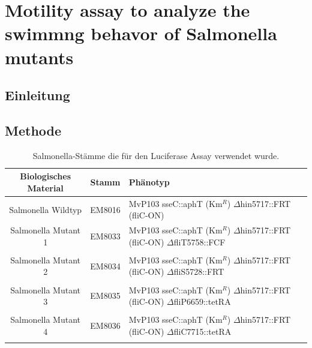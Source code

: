 \documentclass[oneside,10pt,a4paper]{report}
\begin{document}
		\section{Motility assay to analyze the swimmng behavor of Salmonella mutants}
		
			\subsection{Einleitung}
			
			\subsection{Methode}
				\begin{table}[H]
				\centering
				\caption{Salmonella-Stämme die für den Luciferase Assay verwendet wurde.}
				\label{tab: exp6-biologisches Material part3}
				\begin{tabular}{ccp{5cm}}
					\toprule
					Biologisches Material& Stamm & Phänotyp\\
					\midrule
					\multirow{3}{*}{\parbox[t]{2cm}{Salmonella Wildtyp }}  & \multirow{3}{*}{EM8016} & \multirow{3}{*}{\parbox[t]{4.5cm}{MvP103 sseC::aphT (Km$^R$) $\Delta$hin5717::FRT (fliC-ON)}}\\
					&&\\
					&&\\
					\multirow{3}{*}{\parbox[t]{2cm}{Salmonella Mutant 1}}  & \multirow{3}{*}{EM8033} & \multirow{3}{*}{\parbox[t]{4.5cm}{MvP103 sseC::aphT (Km$^R$) $\Delta$hin5717::FRT (fliC-ON) $\Delta$fliT5758::FCF}}\\
					&&\\
					&&\\
					&&\\
					\multirow{3}{*}{\parbox[t]{2cm}{Salmonella Mutant 2}}  & \multirow{3}{*}{EM8034} & \multirow{3}{*}{\parbox[t]{4.5cm}{MvP103 sseC::aphT (Km$^R$) $\Delta$hin5717::FRT (fliC-ON) $\Delta$fliS5728::FRT}}\\
					&&\\
					&&\\
					&&\\
					\multirow{3}{*}{\parbox[t]{2cm}{Salmonella Mutant 3}} & \multirow{3}{*}{EM8035} &\multirow{3}{*}{\parbox[t]{4.5cm}{MvP103 sseC::aphT (Km$^R$) $\Delta$hin5717::FRT (fliC-ON) $\Delta$fliP6659::tetRA}} \\
					&&\\
					&&\\
					&&\\
					\multirow{3}{*}{\parbox[t]{2cm}{Salmonella Mutant 4}} & \multirow{3}{*}{EM8036} &\multirow{3}{*}{\parbox[t]{4.5cm}{MvP103 sseC::aphT (Km$^R$) $\Delta$hin5717::FRT (fliC-ON) $\Delta$fliC7715::tetRA}} \\
					&&\\
					&&\\
					&&\\
					\bottomrule			
				\end{tabular}
			\end{table}
			
\end{document}
